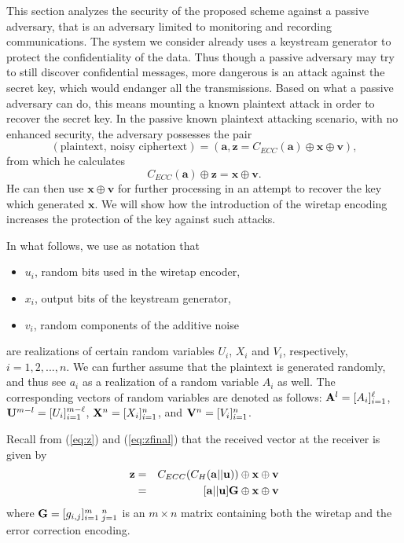 \documentclass{article}[11pt]
\newcommand{\av}{\mathbf{a}}
\newcommand{\vv}{\mathbf{v}}
\newcommand{\xv}{\mathbf{x}}
\newcommand{\zv}{\mathbf{z}}
\begin{document}
This section analyzes the security of the proposed scheme against
a passive adversary, that is an adversary limited to monitoring
and recording communications. The system we consider already uses
a keystream generator to protect the confidentiality of the data.
Thus though a passive adversary may try to still discover
confidential messages, more dangerous is an attack against the
secret key, which would endanger all the transmissions. Based on
what a passive adversary can do, this means mounting a known
plaintext attack in order to recover the secret key. In the
passive known plaintext attacking scenario, with no enhanced
security, the adversary possesses the pair
\[
(\mbox{plaintext, noisy ciphertext}) = (\av,\zv= C_{ECC}(\av)\oplus\xv\oplus\vv),
\]
from which he calculates
\[
C_{ECC}(\av)\oplus\zv=\xv\oplus\vv.
\]
He can then use $\xv\oplus\vv$ for further processing in an attempt
to recover the key which generated $\xv$.
We will show how the introduction of the wiretap encoding increases the
protection of the key against such attacks.

In what follows, we use as notation that
\begin{itemize}
\item
$u_i$, random bits used in the wiretap encoder,
\item
$x_i$, output bits of the keystream generator,
\item
$v_i$, random components of the additive noise
\end{itemize}
are realizations of certain random variables $U_i$, $X_i$ and $V_i$,
respectively, $i=1,2,...,n$. We can further assume that the plaintext
is generated randomly, and thus see $a_i$ as a realization of a random
variable $A_i$ as well. The corresponding vectors of random variables are
denoted as follows: ${\bf A}^l = [A_i]_{i=1}^{\ell}$,
${\bf U}^{m-l}= [U_i]_{i=1}^{m-\ell}$, ${\bf X}^n= [X_i]_{i=1}^n$, and
${\bf V}^n=[V_i]_{i=1}^n$.

Recall from (\ref{eq:z}) and (\ref{eq:zfinal}) that the received vector at the
receiver is given by
\begin{eqnarray*}
{\bf z} &=&  C_{ECC}(C_H({\bf a}||{\bf u}))\oplus {\bf x}\oplus {\bf v}\\
        &=&  [{\bf a}||{\bf u}] {\bf G}\oplus {\bf x}\oplus {\bf v}
\end{eqnarray*}
where ${\bf G} = [g_{i,j}]_{i=1}^{m} \:_{j=1}^n$ is an $m\times n$ matrix
containing both the wiretap and the error correction encoding.
\end{document}
